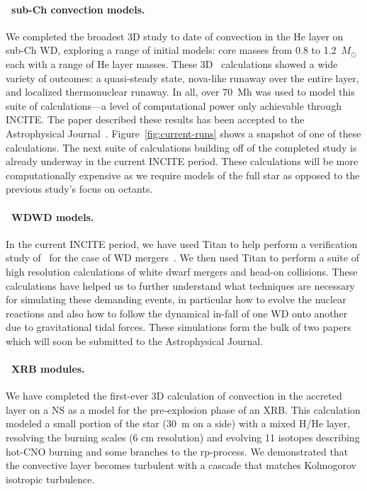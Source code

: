 \documentclass[11pt,letterpaper,english]{article}
\begin{document}
\paragraph{\maestro\ sub-Ch convection models.}
%
We completed the broadest 3D study to date of convection in the He layer
on sub-Ch WD, exploring a range of initial
models: core masses from 0.8 to 1.2~$M_\odot$ each with a range of He layer masses.
These 3D \maestro\ calculations showed a wide variety of outcomes:
a quasi-steady state, nova-like runaway over the entire layer, and 
localized thermonuclear runaway.  In all, over 70~Mh was
used to model this suite of calculations---a level of computational
power only achievable through INCITE.  The paper described these
results has been accepted to the Astrophysical
Journal~\cite{jacobs:2016}.  Figure~\ref{fig:current-runs} shows a
snapshot of one of these calculations.  The next suite of calculations building
off of the completed study is already underway in the current INCITE period.
These calculations will be more computationally expensive as we require
models of the full star as opposed to the previous study's focus on octants.

\paragraph{\castro\ WDWD models.}
%
In the current INCITE period, we have used Titan to help perform
a verification study of \castro\ for the case of WD mergers~\cite{katz:2016}.
We then used Titan to perform a suite of high resolution calculations
of white dwarf mergers and head-on collisions. These calculations have
helped us to further understand what techniques are necessary for
simulating these demanding events, in particular how to evolve the
nuclear reactions and also how to follow the dynamical in-fall of
one WD onto another due to gravitational tidal forces. These simulations
form the bulk of two papers which will soon be submitted to the
Astrophysical Journal.

\paragraph{\maestro\ XRB modules.}
%
We have completed the first-ever 3D calculation of convection in the
accreted layer on a NS as a model for the pre-explosion
phase of an XRB.  This calculation modeled a small portion of the star
(30~m on a side) with a mixed H/He layer, resolving the burning scales
(6 cm resolution) and evolving 11 isotopes describing hot-CNO burning
and some branches to the rp-process.  We demonstrated that the
convective layer becomes turbulent with a cascade that matches
Kolmogorov isotropic turbulence.
\end{document}
